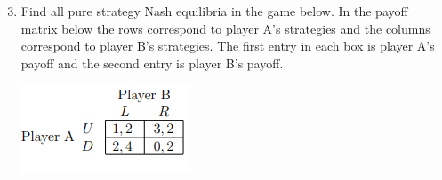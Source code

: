 \documentclass[11pt]{article}
\begin{document}
\begin{enumerate}
	\setcounter{enumi}{2}
	\item Find all pure strategy Nash equilibria in the game below. In the payoff matrix below the rows correspond to player A’s strategies and the columns correspond to player B’s strategies. The first entry in each box is player A’s payoff and the second entry is player B’s payoff.
	\begin{center}
		\includegraphics[scale=1.0]{Figure1.1}
	\end{center}
\end{enumerate}
\end{document}
